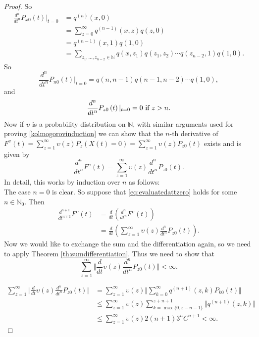 \documentclass[12pt,a4paper]{scrartcl}
\numberwithin{equation}{section}
\newcommand{\N}{\mathbb{N}} %
\begin{document}
\begin{proof}
So
\begin{align*}
\frac{d^n}{dt^n} P_{x0}\left(t\right) |_{t=0} &=q^{\left(n\right)}\left(x,0\right)\\
&= \sum_{z=0}^{\infty} q^{\left(n-1\right)}\left(x,z\right) q\left(z,0\right) \\
&= q^{\left(n-1\right)}\left(x,1\right) q\left(1,0\right)\\
&= \sum_{z_1,\ldots, z_{n-2} \in \N} q\left(x,z_1\right)q\left(z_1,z_2\right)\cdots q\left(z_{n-2},1\right) q\left(1,0\right).
\end{align*}
So
$$ \frac{d^n}{dt^n} P_{n0}\left(t\right) |_{t=0} = q\left(n,n-1\right) q\left(n-1,n-2\right) \cdots q\left(1,0\right), $$
and
\begin{equation}\label{eq:ztolargezero}
\frac{d^n}{dt^n} P_{z0}\left(t\right)|_{t=0} = 0 \textnormal{ if } z > n.
\end{equation}
Now if $\upsilon$ is a probability distribution on $\N$, with similar arguments used for proving \eqref{kolmogorovinduction} we can show that the $n$-th derivative of $F^{\upsilon}\left(t\right) = \sum_{z=1}^{\infty} \upsilon\left(z\right) P_z\left(X\left(t\right) = 0 \right) = \sum_{z=1}^{\infty} \upsilon\left(z\right) P_{z0}\left(t\right)$ exists and is given by
\begin{equation} \label{eq:evaluatedattzero}
\frac{d^n}{dt^n}F^{\upsilon}\left(t\right) = \sum_{z=1}^{\infty} \upsilon\left(z\right) \frac{d^n}{dt^n} P_{z0}\left(t\right).
\end{equation}
In detail, this works by induction over $n$ as follows:\\
The case $n=0$ is clear. So suppose that \eqref{eq:evaluatedattzero} holds for some $n \in \N_0$. Then
\begin{align*}
\frac{d^{n+1}}{dt^{n+1}}F^{\upsilon}\left(t\right) &= \frac{d}{dt} \left(\frac{d^n}{dt^n} F^{\upsilon}\left(t\right) \right) \\
&= \frac{d}{dt} \left( \sum_{z=1}^{\infty} \upsilon\left(z\right) \frac{d^n}{dt^n} P_{z0}\left(t\right) \right).
\end{align*}
Now we would like to exchange the sum and the differentiation again, so we need to apply Theorem \ref{th:sumdifferentiation}. Thus we need to show that
$$ \sum_{z=1}^{\infty}  \Vert \frac{d}{dt} \upsilon\left(z\right) \frac{d^n}{dt^n} P_{z0}\left(t\right) \Vert < \infty .$$

\begin{align*}
\sum_{z=1}^{\infty}  \Vert \frac{d}{dt} \upsilon\left(z\right) \frac{d^n}{dt^n} P_{z0}\left(t\right) \Vert &= \sum_{z=1}^{\infty} \upsilon\left(z\right) \Vert \sum_{k=0}^{\infty} q^{\left(n+1\right)}\left(z,k\right) P_{k0}\left(t\right) \Vert \\
&\leq \sum_{z=1}^{\infty} \upsilon\left(z\right) \sum_{k=\max\lbrace0, z-n-1\rbrace}^{z+n+1} \Vert q^{\left(n+1\right)}\left(z,k\right) \Vert \\
&\leq \sum_{z=1}^{\infty} \upsilon\left(z\right) 2\left(n+1\right) 3^n C^{n+1} < \infty.
\end{align*}


\end{proof}
\end{document}
